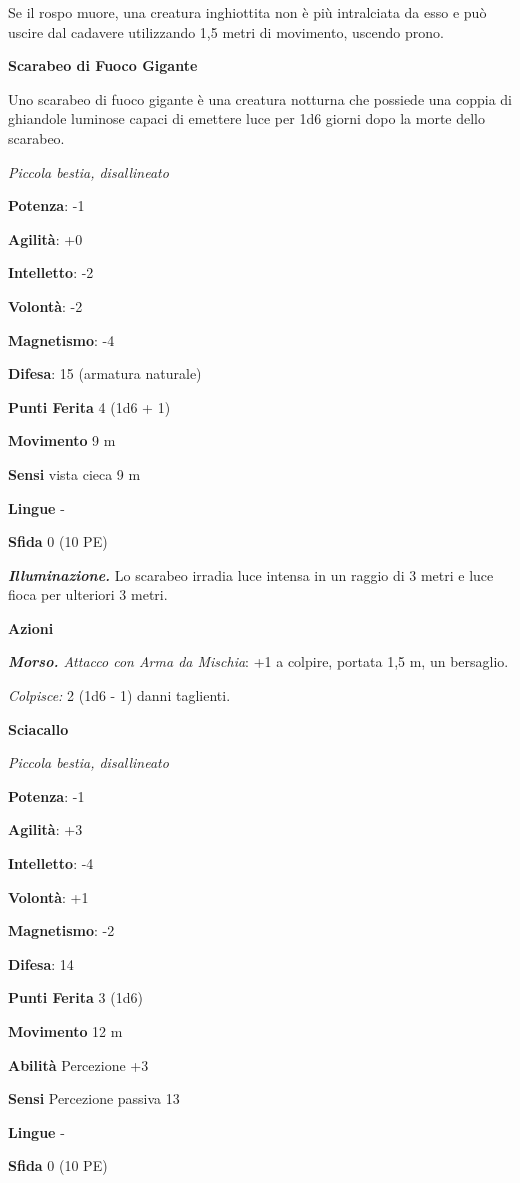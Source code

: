 \begin{multicols}{2}
Se il rospo muore, una creatura inghiottita non è più intralciata da
esso e può uscire dal cadavere utilizzando 1,5 metri di movimento,
uscendo prono.

\textbf{Scarabeo di Fuoco Gigante}

Uno scarabeo di fuoco gigante è una creatura notturna che possiede una
coppia di ghiandole luminose capaci di emettere luce per 1d6 giorni dopo
la morte dello scarabeo.

\emph{Piccola bestia, disallineato}

\textbf{Potenza}: -1

\textbf{Agilità}: +0

\textbf{Intelletto}: -2

\textbf{Volontà}: -2

\textbf{Magnetismo}: -4

\textbf{Difesa}: 15 (armatura naturale)

\textbf{Punti Ferita} 4 (1d6 + 1)

\textbf{Movimento} 9 m

\textbf{Sensi} vista cieca 9 m

\textbf{Lingue} -

\textbf{Sfida} 0 (10 PE)

\emph{\textbf{Illuminazione.}} Lo scarabeo irradia luce intensa in un
raggio di 3 metri e luce fioca per ulteriori 3 metri.

\textbf{Azioni}

\emph{\textbf{Morso.} Attacco con Arma da Mischia}: +1 a colpire,
portata 1,5 m, un bersaglio.

\emph{Colpisce:} 2 (1d6 - 1) danni taglienti.

\textbf{Sciacallo}

\emph{Piccola bestia, disallineato}

\textbf{Potenza}: -1

\textbf{Agilità}: +3

\textbf{Intelletto}: -4

\textbf{Volontà}: +1

\textbf{Magnetismo}: -2

\textbf{Difesa}: 14

\textbf{Punti Ferita} 3 (1d6)

\textbf{Movimento} 12 m

\textbf{Abilità} Percezione +3

\textbf{Sensi} Percezione passiva 13

\textbf{Lingue} -

\textbf{Sfida} 0 (10 PE)


\end{multicols}
